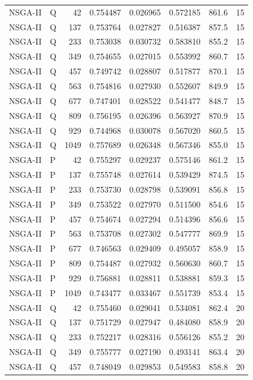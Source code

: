 \begin{longtable}{llrrrrrr}
NSGA-II & Q & 42 & 0.754487 & 0.026965 & 0.572185 & 861.6 & 15 \\
NSGA-II & Q & 137 & 0.753764 & 0.027827 & 0.516387 & 857.5 & 15 \\
NSGA-II & Q & 233 & 0.753038 & 0.030732 & 0.583810 & 855.2 & 15 \\
NSGA-II & Q & 349 & 0.754655 & 0.027015 & 0.553992 & 860.7 & 15 \\
NSGA-II & Q & 457 & 0.749742 & 0.028807 & 0.517877 & 870.1 & 15 \\
NSGA-II & Q & 563 & 0.754816 & 0.027930 & 0.552607 & 849.9 & 15 \\
NSGA-II & Q & 677 & 0.747401 & 0.028522 & 0.541477 & 848.7 & 15 \\
NSGA-II & Q & 809 & 0.756195 & 0.026396 & 0.563927 & 870.9 & 15 \\
NSGA-II & Q & 929 & 0.744968 & 0.030078 & 0.567020 & 860.5 & 15 \\
NSGA-II & Q & 1049 & 0.757689 & 0.026348 & 0.567346 & 855.0 & 15 \\
NSGA-II & P & 42 & 0.755297 & 0.029237 & 0.575146 & 861.2 & 15 \\
NSGA-II & P & 137 & 0.755748 & 0.027614 & 0.539429 & 874.5 & 15 \\
NSGA-II & P & 233 & 0.753730 & 0.028798 & 0.539091 & 856.8 & 15 \\
NSGA-II & P & 349 & 0.753522 & 0.027970 & 0.511500 & 854.6 & 15 \\
NSGA-II & P & 457 & 0.754674 & 0.027294 & 0.514396 & 856.6 & 15 \\
NSGA-II & P & 563 & 0.753708 & 0.027302 & 0.547777 & 869.9 & 15 \\
NSGA-II & P & 677 & 0.746563 & 0.029409 & 0.495057 & 858.9 & 15 \\
NSGA-II & P & 809 & 0.754487 & 0.027932 & 0.560630 & 860.7 & 15 \\
NSGA-II & P & 929 & 0.756881 & 0.028811 & 0.538881 & 859.3 & 15 \\
NSGA-II & P & 1049 & 0.743477 & 0.033467 & 0.551739 & 853.4 & 15 \\
NSGA-II & Q & 42 & 0.755460 & 0.029041 & 0.534081 & 862.4 & 20 \\
NSGA-II & Q & 137 & 0.751729 & 0.027947 & 0.484080 & 858.9 & 20 \\
NSGA-II & Q & 233 & 0.752217 & 0.028316 & 0.556126 & 855.2 & 20 \\
NSGA-II & Q & 349 & 0.755777 & 0.027190 & 0.493141 & 863.4 & 20 \\
NSGA-II & Q & 457 & 0.748049 & 0.029853 & 0.549583 & 858.8 & 20 \\

\end{longtable}
